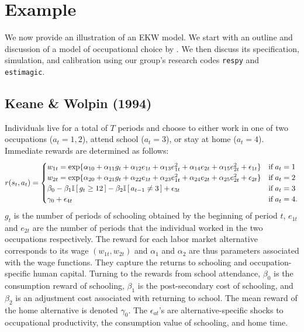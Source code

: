 \section{Example}\label{Example}
We now provide an illustration of an EKW model. We start with an outline and discussion of a model of occupational choice by \citet{Keane.1994}. We then discuss its specification, simulation, and calibration using our group's research codes \verb+respy+ and \verb+estimagic+.
\subsection{Keane \& Wolpin (1994)}
Individuals live for a total of $T$ periods and choose to either work in one of two occupations ($a_t = 1, 2$), attend school ($a_t = 3$), or stay at home ($a_t = 4$). Immediate rewards are determined as follows:
%
\begin{align*}
r(s_t, a_t) = \begin{cases} w_{1t} =
\exp\{\alpha_{10} + \alpha_{11}g_t + \alpha_{12}e_{1t} + \alpha_{13}e^2_{1t} + \alpha_{14}e_{2t} + \alpha_{15}e^2_{2t} + \epsilon_{1t}\} & \text{if}\; a_t = 1 \\
w_{2t} = \exp\{\alpha_{20} + \alpha_{21}g_t + \alpha_{22}e_{1t} + \alpha_{23}e^2_{1t} + \alpha_{24}e_{2t} + \alpha_{25}e^2_{2t} + \epsilon_{2t}\}& \text{if}\; a_t = 2 \\
\beta_0 - \beta_1 \mathbb{I}\,[\,g_t \geq 12\,] - \beta_2\mathbb{I}\,[\,a_{t - 1} \neq 3\,] + \epsilon_{3t}& \text{if}\; a_t = 3 \\
\gamma_0 + \epsilon_{4t}& \text{if}\; a_t = 4. \\
\end{cases}
\end{align*}
%
$g_t$ is the number of periods of schooling obtained by the beginning of period $t$, $e_{1t}$ and $e_{2t}$ are the number of periods that the individual worked in the two occupations respectively. The reward for each labor market alternative corresponds to its wage $(w_{1t}, w_{2t})$ and $\alpha_{1}$ and $\alpha_{2}$ are thus parameters associated with the wage functions. They capture the returns to schooling and occupation-specific human capital. Turning to the rewards from school attendance, $\beta_0$ is the consumption reward of schooling, $\beta_1$ is the post-secondary cost of schooling, and $\beta_2$ is an adjustment cost associated with returning to school. The mean reward of the home alternative is denoted $\gamma_0$. The $\epsilon_{at}$'s are alternative-specific shocks to occupational productivity, the consumption value of schooling, and home time.\\

